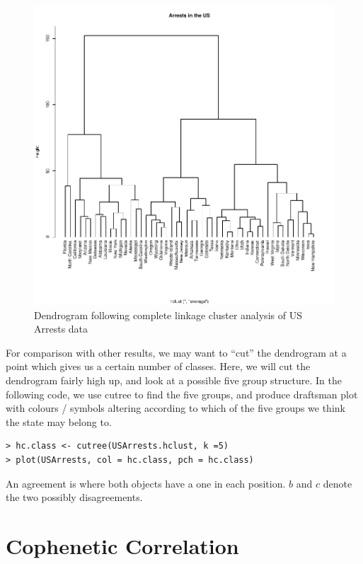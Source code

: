 \begin{figure}
\begin{center}
\includegraphics{images/hclust}
\caption{Dendrogram following complete linkage cluster analysis of US Arrests data}
\label{hclust}
\end{center}
\end{figure}

For comparison with other results, we may want to ``cut'' the dendrogram at a point which gives us a certain number of classes.   Here, we will cut the dendrogram fairly high up, and look at a possible five group structure.   In the following code, we use cutree to find the five groups, and produce draftsman plot with colours / symbols altering according to which of the five groups we think the state may belong to.

\singlespacing
\begin{verbatim}
> hc.class <- cutree(USArrests.hclust, k =5)
> plot(USArrests, col = hc.class, pch = hc.class)
\end{verbatim}
\onehalfspacing

An agreement is where both objects have a one in each position.   $b$ and $c$ denote the two possibly disagreements.

\section{Cophenetic Correlation}

